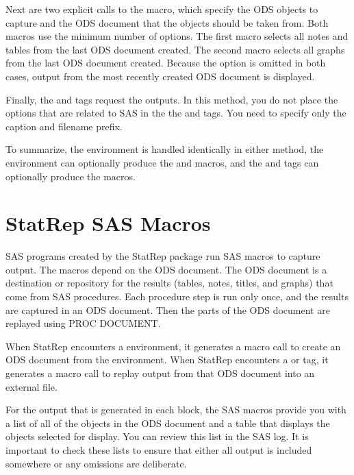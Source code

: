 \documentclass[article,oneside]{memoir}
\newcommand*{\StatRep}{\textsf{StatRep}\xspace}
\begin{document}
  Next are two explicit calls to the  macro, which
  specify the ODS objects to capture and the ODS document that the objects
  should be taken from.
  Both  macros use the minimum number of options.
  The first  macro selects all
  notes and tables from the last ODS document created. The second  macro
  selects all graphs from the last ODS document created.
  Because the  option is omitted in both cases,
  output from the most recently created ODS document is displayed.

  Finally, the  and  tags request the outputs.
  In
  this method, you do not place the options that are related to SAS in the
  the  and  tags. You need to
  specify only the caption and filename prefix.


  To summarize, the  environment is handled identically in either method,
  the  environment can optionally produce the  and  macros,
  and the  and  tags can optionally produce the  macros.

\chapter{\StatRep SAS Macros}\label{macros}
  SAS programs created by the \StatRep package
  run SAS macros to capture output. The macros depend on the ODS document.
  The ODS document is a destination or repository for the results
  (tables, notes, titles, and graphs)
  that come from SAS procedures. Each procedure step is run only once,
  and the results are captured in an ODS document.
  Then the parts of the ODS document are replayed using PROC DOCUMENT.

  When \StatRep encounters a  environment,
  it generates a macro call to create an ODS document from the environment.
  When \StatRep encounters a  or  tag,
  it generates a macro call to replay output from that ODS document into an external file.

  For the output that is generated in each  block, the SAS macros provide you
  with a list of all
  of the objects in the ODS document and a table that displays
  the objects selected for display. You can
  review this list in the SAS log.
  It is important to check these lists to ensure that either all output
  is included somewhere or any omissions are deliberate.
\end{document}

